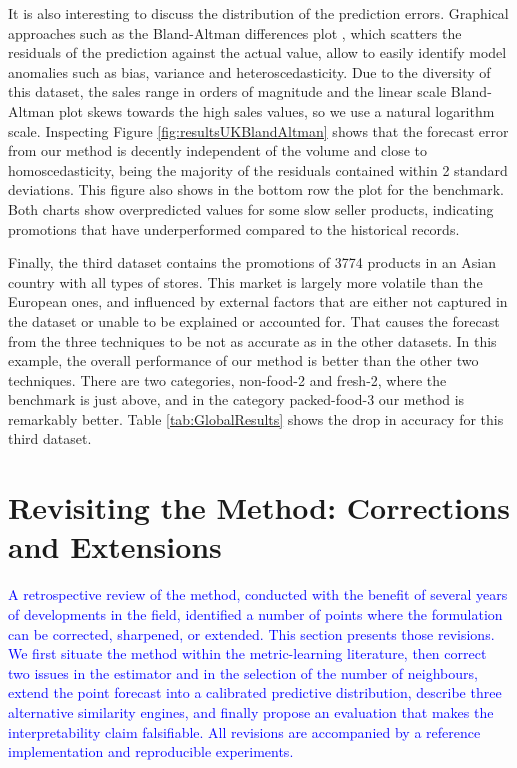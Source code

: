 \documentclass{ieeeaccess}
\newcommand{\myblue}[1]{\textcolor{blue}{#1}}
\begin{document}
It is also interesting to discuss the distribution of the prediction errors. Graphical approaches such as the Bland-Altman differences plot \cite{bland1986statistical}, which scatters the residuals of the prediction against the actual value, allow to easily identify model anomalies such as bias, variance and heteroscedasticity. Due to the diversity of this dataset, the sales range in orders of magnitude and the linear scale Bland-Altman plot skews towards the high sales values, so we use a natural logarithm scale. Inspecting Figure \ref{fig:resultsUKBlandAltman} shows that the forecast error from our method is decently independent of the volume and close to homoscedasticity, being the majority of the residuals contained within 2 standard deviations. This figure also shows in the bottom row the plot for the benchmark. Both charts show overpredicted values for some slow seller products, indicating promotions that have underperformed compared to the historical records.

Finally, the third dataset contains the promotions of 3774 products in an Asian country with all types of stores. This market is largely more volatile than the European ones, and influenced by external factors that are either not captured in the dataset or unable to be explained or accounted for. That causes the forecast from the three techniques to be not as accurate as in the other datasets. In this example, the overall performance of our method is better than the other two techniques. There are two categories, non-food-2 and fresh-2, where the benchmark is just above, and in the category packed-food-3 our method is remarkably better. Table \ref{tab:GlobalResults} shows the drop in accuracy for this third dataset.

\section{Revisiting the Method: Corrections and Extensions} \label{sect:Revision}

\myblue{A retrospective review of the method, conducted with the benefit of
several years of developments in the field, identified a number of points where
the formulation can be corrected, sharpened, or extended. This section presents
those revisions. We first situate the method within the metric-learning
literature, then correct two issues in the estimator and in the selection of the
number of neighbours, extend the point forecast into a calibrated predictive
distribution, describe three alternative similarity engines, and finally propose
an evaluation that makes the interpretability claim falsifiable. All revisions
are accompanied by a reference implementation and reproducible experiments.}
\end{document}
